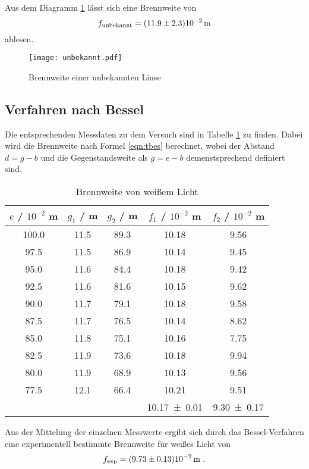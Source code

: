 Aus dem Diagramm \ref{fig:fiunb} lässt sich eine Brennweite von
\begin{equation}
  f_\text{unbekannt} = (\num{11.9 +- 2.3})10^{-2} \, \text{m}
  \label{eqn:unb}
\end{equation}
ablesen.
\begin{figure}
  \centering
  \texttt{[image: unbekannt.pdf]}
  \caption{Brennweite einer unbekannten Linse}
  \label{fig:fiunb}
\end{figure}
\subsection{Verfahren nach Bessel}
Die entsprechenden Messdaten zu dem Versuch sind in Tabelle \ref{tab:ffw} zu finden. Dabei wird die Brennweite nach Formel \eqref{eqn:tbes} berechnet, wobei der Abstand $d = g - b$ und die Gegenstandsweite als $g = e - b$ demenstsprechend definiert sind.
\begin{table}
  \centering
  \begin{tabular}{c c c | c c}
    \toprule
    $e$ / $10^{-2}$ m & $g_1$ / m & $g_2$ / m & $f_1$ / $10^{-2}$ m & $f_2$ / $10^{-2}$ m\\
    \midrule
	100.0	& 11.5	& 89.3	& 10.18	& 9.56	\\
	97.5	& 11.5	& 86.9	& 10.14	& 9.45	\\
	95.0	& 11.6	& 84.4	& 10.18	& 9.42	\\
	92.5	& 11.6	& 81.6	& 10.15	& 9.62	\\
	90.0	& 11.7	& 79.1	& 10.18	& 9.58	\\
	87.5	& 11.7	& 76.5	& 10.14	& 8.62	\\
	85.0	& 11.8	& 75.1	& 10.16	& 7.75	\\
	82.5	& 11.9	& 73.6	& 10.18	& 9.94	\\
	80.0	& 11.9	& 68.9	& 10.13	& 9.56	\\
	77.5	& 12.1	& 66.4	& 10.21	& 9.51	\\
   \midrule
		&	&	& \num{10.17 +- 0.01} & \num{9.30 +- 0.17} \\
   \bottomrule
  \end{tabular}
  	\caption{Brennweite von weißem Licht}
  \label{tab:ffw}
\end{table}
Aus der Mittelung der einzelnen Messwerte ergibt sich durch das Bessel-Verfahren eine experimentell bestimmte Brennweite für weißes Licht von
\begin{equation}
  f_\text{exp} = (\num{9.73 +- 0.13}) 10^{-2} \, \text{m} \ .
  \label{eqn:fexp}
\end{equation}
